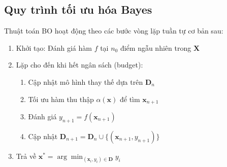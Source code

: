 \subsection{Quy trình tối ưu hóa Bayes}

Thuật toán BO hoạt động theo các bước vòng lặp tuần tự cơ bản sau:

\begin{enumerate}
    \item Khởi tạo: Đánh giá hàm $f$ tại $n_0$ điểm ngẫu nhiên trong $\mathbf{X}$
    \item Lặp cho đến khi hết ngân sách (budget):
    \begin{enumerate}
        \item Cập nhật mô hình thay thế dựa trên $\mathbf{D}_n$
        \item Tối ưu hàm thu thập $\alpha(\mathbf{x})$ để tìm $\mathbf{x}_{n+1}$
        \item Đánh giá $y_{n+1} = f(\mathbf{x}_{n+1})$
        \item Cập nhật $\mathbf{D}_{n+1} = \mathbf{D}_n \cup \{(\mathbf{x}_{n+1}, y_{n+1})\}$
    \end{enumerate}
    \item Trả về $\mathbf{x}^* = \arg\min_{(\mathbf{x}_i, y_i) \in \mathbf{D}} y_i$
\end{enumerate}

